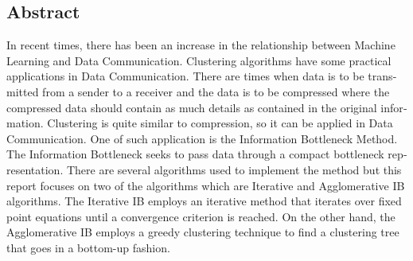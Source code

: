 
\begin{otherlanguage}{english}
\subsection*{Abstract}
In recent times, there has been an increase in the relationship between Machine Learning and Data Communication. Clustering algorithms have some practical applications in Data Communication. There are times when data is to be transmitted from a sender to a receiver and the data is to be compressed where the compressed data should contain as much details as contained in the original information. Clustering is quite similar to compression, so it can be applied in Data Communication. One of such application is the Information Bottleneck Method. The Information Bottleneck seeks to pass data through a compact bottleneck representation. There are several algorithms used to implement the method but this report focuses on two of the algorithms which are Iterative and Agglomerative IB algorithms. The Iterative IB employs an iterative method that iterates over fixed point equations until a convergence criterion is reached. On the other hand, the Agglomerative IB employs a greedy clustering technique to find a clustering tree that goes in a bottom-up fashion.
\end{otherlanguage}

